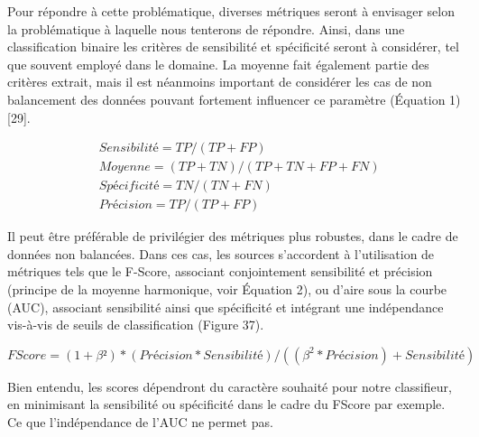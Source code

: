 Pour répondre à cette problématique, diverses métriques seront à envisager selon la problématique à laquelle nous tenterons de répondre. Ainsi, dans une classification binaire les critères de sensibilité et spécificité seront à considérer, tel que souvent employé dans le domaine. La moyenne fait également partie des critères extrait, mais il est néanmoins important de considérer les cas de non balancement des données pouvant fortement influencer ce paramètre (Équation 1)[29]. 

\begin{equation} 
    \label{eq:chapter_3:Metrics}
    \begin{split}
    &Sensibilité=  TP/(TP+FP) \\	
    &Moyenne=(TP+TN)/(TP+TN+FP+FN) \\
    &Spécificité=  TN/(TN+FN) \\
    &Précision=TP/(TP+FP)
    \end{split}
\end{equation}

Il peut être préférable de privilégier des métriques plus robustes, dans le cadre de données non balancées. Dans ces cas, les sources s’accordent à l’utilisation de métriques tels que le F-Score, associant conjointement sensibilité et précision (principe de la moyenne harmonique, voir Équation 2), ou d’aire sous la courbe (AUC), associant sensibilité ainsi que spécificité et intégrant une indépendance vis-à-vis de seuils de classification (Figure 37).\par

\begin{equation} 
    FScore=(1+\beta²)*(Précision*Sensibilité)/((\beta^2*Précision )+Sensibilité)
    \label{eq:FScore}
\end{equation}


Bien entendu, les scores dépendront du caractère souhaité pour notre classifieur, en minimisant la sensibilité ou spécificité dans le cadre du FScore par exemple. Ce que l’indépendance de l’AUC ne permet pas.\par
 
